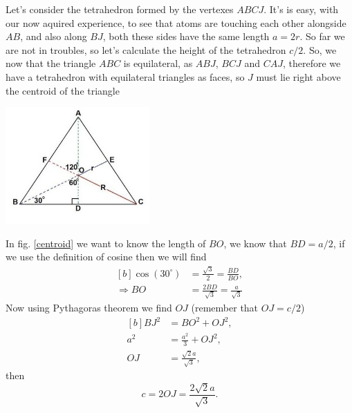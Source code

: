 \begin{questions}
\begin{solution}
  \label{hcp}\vspace{0.5cm}

Let's consider the tetrahedron formed by the vertexes $ABCJ$. It's is easy, with our now aquired experience, to see that atoms are touching each other alongside $AB$, and also along $BJ$, both these sides have the same length $a = 2r$. So far we are not in troubles, so let's calculate the height of the tetrahedron $c/2$. So, we now that the triangle $ABC$ is equilateral, as $ABJ$, $BCJ$ and $CAJ$, therefore we have a tetrahedron with equilateral triangles as faces, so $J$ must lie right above the centroid of the triangle

\begin{center}
  \includegraphics[width=55mm]{centroid}
\end{center}

\label{centroid}\vspace{0.5cm}

In fig. \ref{centroid} we want to know the length of $BO$, we know that $BD = a/2$, if we use the definition of cosine then we will find
\begin{equation}
  \begin{aligned}[b]
    \cos(30^\circ) &= \frac{\sqrt{3}}{2} = \frac{BD}{BO}, \\
    \Rightarrow BO &= \frac{2BD}{\sqrt{3}} = \frac{a}{\sqrt{3}}
  \end{aligned}
  \label{bo}
\end{equation}
Now using Pythagoras theorem we find $OJ$ (remember that $OJ = c/2$)
\begin{equation}
  \begin{aligned}[b]
    BJ^2 &= BO^2 + OJ^2,\\
    a^2 &= \frac{a^2}{3} + OJ^2,\\
    OJ &= \frac{\sqrt{2}a}{\sqrt{3}},
  \end{aligned}
\end{equation}
then
\begin{equation}
  c = 2OJ = \frac{2\sqrt{2}a}{\sqrt{3}}.
\end{equation}


\end{solution}
\end{questions}
